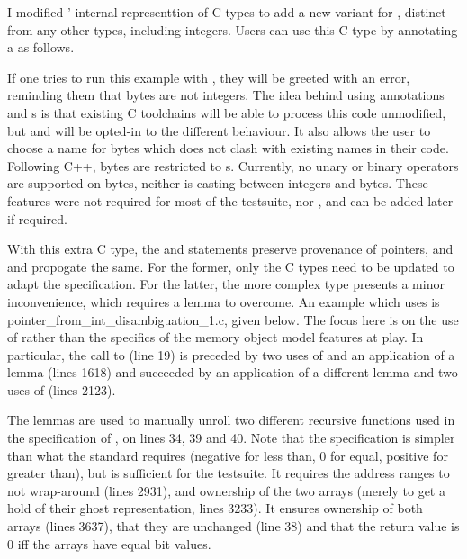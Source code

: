 I modified ' internal representtion of C types to add a new
variant for , distinct from any other types, including
integers. Users can use this C type by annotating a 
as follows.


If one tries to run this example with , they will be greeted with
an error, reminding them that bytes are not integers. The idea behind using
annotations and s is that existing C toolchains will be able
to process this code unmodified, but  and  will be opted-in
to the different behaviour. It also allows the user to choose a name for bytes
which does not clash with existing names in their code. Following C++, bytes
are restricted to s. Currently, no unary or binary
operators are supported on bytes, neither is casting between integers and
bytes. These features were not required for most of the  testsuite, nor
, and can be added later if required.

With this extra C type, the  and 
statements preserve provenance of pointers, and  and
 propogate the same. For the former, only the C types need to
be updated to adapt the specification. For the latter, the more complex type
presents a minor inconvenience, which requires a lemma to overcome. An example
which uses  is pointer\_from\_int\_disambiguation\_1.c, given
below. The focus here is on the use of  rather than the
specifics of the memory object model features at play. In particular, the call
to  (line 19) is preceded by two uses of 
and an application of a lemma (lines 16\textendash{}18) and succeeded by an
application of a different lemma and two uses of  (lines
21\textendash{}23).


The lemmas are used to manually unroll two different recursive functions used
in the specification of , on lines 34, 39 and 40. Note that the
specification is simpler than what the standard requires (negative for less
than, 0 for equal, positive for greater than), but is sufficient for the
 testsuite. It requires the address ranges to not wrap-around (lines
29\textendash{}31), and ownership of the two arrays (merely to get a hold of
their ghost representation, lines 32\textendash{}33). It ensures ownership of
both arrays (lines 36\textendash{}37), that they are unchanged (line 38) and
that the return value is 0 iff the arrays have equal bit values.


